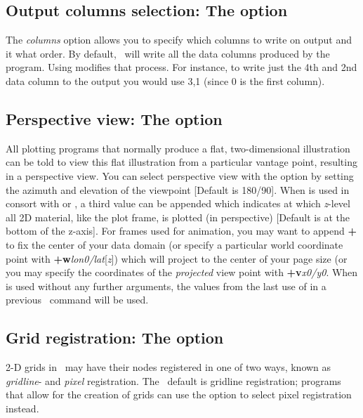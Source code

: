 \subsection{Output columns selection: The  option}
\label{sec:outcols}
The \emph{columns} option allows you to specify which
columns to write on output and it what order.  By default, \GMT\ will
write all the data columns produced by the program.
Using  modifies that process.  For instance, to write just the 4th and
2nd data column to the output you would use 3,1 (since 0 is the first column).

\subsection{Perspective view: The  option}

All plotting programs that normally produce a flat, two-dimensional illustration can
be told to view this flat illustration from a particular vantage point, resulting in
a perspective view.  You can select perspective view with the  option by setting
the azimuth and elevation of the viewpoint [Default is 180/90].
When  is used in consort with  or , a third value can be appended which indicates
at which {\it z}-level all 2D material, like the plot frame, is plotted (in perspective) 
[Default is at the bottom of the z-axis].
For frames used for animation, you may want to append {\bf +} to fix the center
of your data domain (or specify a particular world coordinate point with {\bf +w}{\it lon0/lat}[{\it z}])
which will project to the center of your page size (or you may specify the coordinates
of the \emph{projected} view point with {\bf +v}{\it x0/y0}.
When  is used without any further arguments, the values from the last use of  in a previous \GMT\
command will be used.

\subsection{Grid registration: The  option}
\label{sec:grid_registration}
2-D grids in \GMT\ may have their nodes registered in one of two ways, known
as \emph{gridline}- and \emph{pixel} registration.  The \GMT\ default is
gridline registration; programs that allow for the creation of grids can
use the \Opt{r} option to select pixel registration instead.

